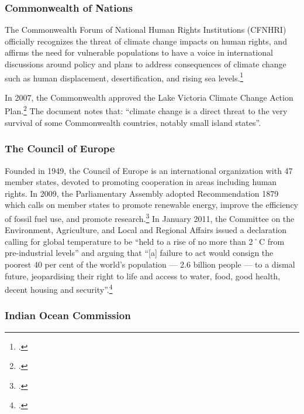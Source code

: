 	\subsubsection{Commonwealth of Nations}
	


The Commonwealth Forum of National Human Rights Institutions (CFNHRI) officially recognizes the threat of climate change impacts on human rights, and affirms the need for vulnerable populations to have a voice in international discussions around policy and plans to address consequences of climate change such as human displacement, desertification, and rising sea levels.\footcite[][]{CFNHRIHumanRights}



In 2007, the Commonwealth approved the Lake Victoria Climate Change Action Plan.\footcite[][]{LakeVictoriaPlan}
The document notes that: ``climate change is a direct threat to the very survival of some Commonwealth countries, notably small island states''.



	\subsubsection{The Council of Europe}
	


Founded in 1949, the Council of Europe is an international organization with 47 member states, devoted to promoting cooperation in areas including human rights.
In 2009, the Parliamentary Assembly adopted Recommendation 1879 which calls on member states to promote renewable energy, improve the efficiency of fossil fuel use, and promote research.\footcite[][]{COERec1879}
In January 2011, the Committee on the Environment, Agriculture, and Local and Regional Affairs issued a declaration calling for global temperature to be ``held to a rise of no more than 2˚C from pre-industrial levels'' and arguing that ``[a] failure to act would consign the poorest 40 per cent of the world's population --- 2.6 billion people --- to a dismal future, jeopardising their right to life and access to water, food, good health, decent housing and security''.\footcite[][]{COE2011decl}



	\subsubsection{Indian Ocean Commission}
	


